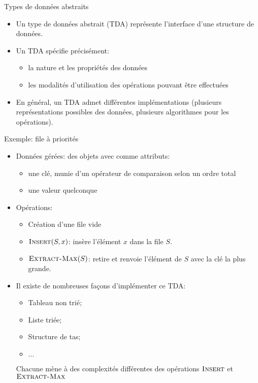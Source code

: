 \begin{frame}{Types de données abstraits}

\begin{itemize}
\item Un type de données abstrait (TDA) représente l'interface d'une structure de données.
\item Un TDA spécifie précisément:
\begin{itemize}
\item la nature et les propriétés des données
\item les modalités d'utilisation des opérations pouvant être effectuées
\end{itemize}
\item En général, un TDA admet différentes implémentations (plusieurs représentations possibles des données, plusieurs algorithmes pour les opérations).
\end{itemize}

\end{frame}

\begin{frame}{Exemple: file à priorités}

\begin{itemize}
\item Données gérées: des objets avec comme attributs:
\begin{itemize}
\item une clé, munie d'un opérateur de comparaison selon un ordre total
\item une valeur quelconque
\end{itemize}
\medskip
\item Opérations:
\begin{itemize}
\item Création d'une file vide
\item $\textnormal{\scshape Insert}(S,x)$: insère l'élément $x$ dans la file $S$.
\item $\textnormal{\scshape Extract-Max}(S)$: retire et renvoie l'élément de $S$ avec
  la clé la plus grande.
\end{itemize}
\medskip
\item Il existe de nombreuses façons d'implémenter ce TDA:
\begin{itemize}
\item Tableau non trié;
\item Liste triée;
\item Structure de tas;
\item $\ldots$
\end{itemize}
Chacune mène à des complexités différentes des opérations $\textnormal{\scshape Insert}$ et $\textnormal{\scshape Extract-Max}$
\end{itemize}

\end{frame}

